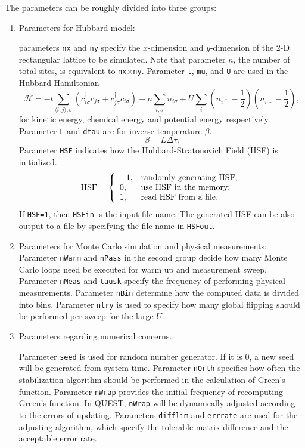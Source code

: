 \documentclass[12pt]{article}
\begin{document}
The parameters can be roughly divided into three groups:
\begin{enumerate}
\item Parameters for Hubbard model:

parameters \verb|nx| and \verb|ny|
specify the $x$-dimension and $y$-dimension of the 2-D rectangular lattice to
be simulated. Note that parameter $n$, the number of total sites,
is equivalent to \verb|nx|$\times$\verb|ny|.
Parameter \verb|t|, \verb|mu|, and \verb|U| are used in the Hubbard Hamiltonian
$$\mathcal{H}=-t \sum_{\langle i,j\rangle, \sigma} \left(c^{\dag}_{i\sigma}c_{j\sigma}+c^{\dag}_{j\sigma}c_{i\sigma}\right)
             -\mu \sum_{i, \sigma}n_{i\sigma}
             +U \sum_{i} \left(n_{i\uparrow}-\frac{1}{2}\right) \left(n_{i\downarrow}-\frac{1}{2}\right),$$
for kinetic energy, chemical energy and potential energy respectively.
Parameter \verb|L| and \verb|dtau| are for inverse temperature $\beta$.
$$\beta = L \Delta\tau.$$
Parameter \verb"HSF" indicates how the Hubbard-Stratonovich Field (HSF) is initialized.
$$
\mbox{HSF} = \left\{
                      \begin{array}{ll}
                        -1, & \hbox{randomly generating HSF;} \\
                        0, & \hbox{use HSF in the memory;} \\
                        1, & \hbox{read HSF from a file.}
                      \end{array}
                    \right.
$$
If \verb"HSF=1", then \verb"HSFin" is the input file name. The generated HSF can be also output to a file by specifying the file name in \verb"HSFout".

\item Parameters for Monte Carlo simulation and physical measurements:
Parameter \verb|nWarm| and \verb|nPass| in the second group decide how many Monte Carlo loops
need be executed for warm up and measurement sweep. Parameter \verb|nMeas| and \verb|tausk| specify the frequency
of performing physical measurements. Parameter \verb|nBin|
determine how the computed data is divided into bins. Parameter \verb"ntry" is used to specify how many global flipping should be performed per sweep for the large $U$.

\item Parameters regarding numerical concerns.

Parameter \verb|seed| is used for random number generator.
If it is 0, a new seed will be generated from system time.
Parameter \verb|nOrth| specifies how often the stabilization algorithm
should be performed in the calculation of Green's function.
Parameter \verb|nWrap| provides the initial frequency of recomputing Green's function.
In QUEST, \verb|nWrap| will be dynamically adjusted according to the errors
of updating. Parameters \verb|difflim| and \verb|errrate| are used for the adjusting
algorithm, which specify the tolerable matrix difference and the acceptable error rate.
\end{enumerate}
\end{document}

